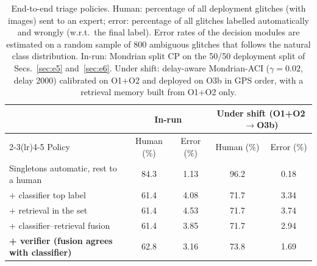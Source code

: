 \begin{table}[!htbp]
\caption{End-to-end triage policies. Human: percentage of all deployment glitches (with images) sent to an expert; error:
percentage of all glitches labelled automatically and wrongly (w.r.t.\ the final label). Error rates of the decision modules are
estimated on a random sample of 800 ambiguous glitches that follows the natural class distribution. In-run: Mondrian split CP on the
50/50 deployment split of Secs.~\ref{sec:e5} and~\ref{sec:e6}. Under shift: delay-aware Mondrian-ACI ($\gamma=0.02$, delay 2000) calibrated on O1+O2 and deployed on
O3b in GPS order, with a retrieval memory built from O1+O2 only.}\label{tab:e8}
\centering\footnotesize\setlength{\tabcolsep}{4pt}
\begin{tabular}{lcccc}\toprule
 & \multicolumn{2}{c}{In-run} & \multicolumn{2}{c}{Under shift (O1+O2$\rightarrow$O3b)}\\\cmidrule(lr){2-3}\cmidrule(lr){4-5}
Policy & Human (\%) & Error (\%) & Human (\%) & Error (\%)\\\midrule
Singletons automatic, rest to a human & 84.3 & 1.13 & 96.2 & 0.18\\
\midrule
+ classifier top label & 61.4 & 4.08 & 71.7 & 3.34\\
+ retrieval in the set & 61.4 & 4.53 & 71.7 & 3.74\\
+ classifier--retrieval fusion & 61.4 & 3.85 & 71.7 & 2.94\\
\textbf{+ verifier (fusion agrees with classifier)} & 62.8 & 3.16 & 73.8 & 1.69\\
\bottomrule
\end{tabular}
\end{table}
